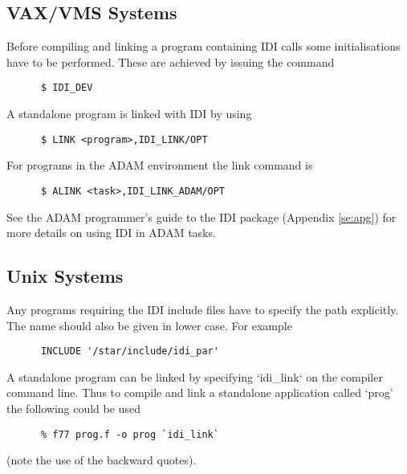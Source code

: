 \subsection{VAX/VMS Systems}

Before compiling and linking a program containing IDI calls some
initialisations have to be performed. These are achieved by issuing the
command
\begin{small}
\begin{verbatim}
      $ IDI_DEV
\end{verbatim}
\end{small}

A standalone program is linked with IDI by using
\begin{small}
\begin{verbatim}
      $ LINK <program>,IDI_LINK/OPT
\end{verbatim}
\end{small}

For programs in the ADAM environment the link command is
\begin{small}
\begin{verbatim}
      $ ALINK <task>,IDI_LINK_ADAM/OPT
\end{verbatim}
\end{small}

See the ADAM programmer's guide to the IDI package (Appendix \ref{se:apg})
for more details on using IDI in ADAM tasks.

\subsection{Unix Systems}

Any programs requiring the IDI include files have to specify the path
explicitly. The name should also be given in lower case. For example
\begin{small}
\begin{verbatim}
      INCLUDE '/star/include/idi_par'
\end{verbatim}
\end{small}

A standalone program can be linked by specifying `idi\_link` on the
compiler command line. Thus to compile and link a standalone application
called `prog' the following could be used
\begin{small}
\begin{verbatim}
      % f77 prog.f -o prog `idi_link`
\end{verbatim}
\end{small}
(note the use of the backward quotes).

